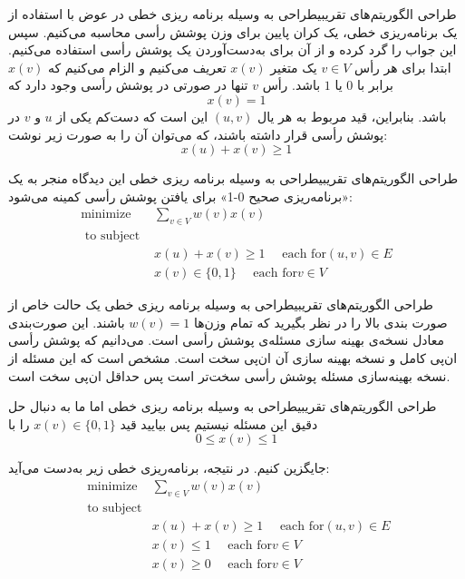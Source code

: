 \begin{itemframe-s}{طراحی الگوریتم‌های تقریبی}{طراحی به وسیله برنامه ریزی خطی}
\itm
در عوض با استفاده از یک برنامه‌ریزی خطی، یک کران پایین برای وزن پوشش رأسی محاسبه می‌کنیم.
سپس این جواب را گرد کرده و از آن برای به‌دست‌آوردن یک پوشش رأسی استفاده می‌کنیم.
\itm
ابتدا برای هر رأس $v \in V$ یک متغیر $x(v)$ تعریف می‌کنیم و الزام می‌کنیم که $x(v)$ برابر با $0$ یا $1$ باشد.
رأس $v$ تنها در صورتی در پوشش رأسی وجود دارد که
$$x(v) = 1$$
باشد. بنابراین، قید مربوط به هر یال $(u, v)$ این است که دست‌کم یکی از $u$ و $v$ در پوشش رأسی قرار داشته باشند، که می‌توان آن را به صورت زیر نوشت:
$$x(u) + x(v) \geq 1$$
\end{itemframe-s}


\begin{itemframe-s}{طراحی الگوریتم‌های تقریبی}{طراحی به وسیله برنامه ریزی خطی}
\itm
این دیدگاه منجر به یک «برنامه‌ریزی صحیح 0-1»
 برای یافتن پوشش رأسی کمینه می‌شود:
\begin{align*}
\text{minimize } & \sum_{v \in V} w(v) x(v)\\
\text{ to subject }& \\[3pt]
&x(u) + x(v) \geq 1 \quad \text{ each for} (u, v) \in E\\[3pt]
&x(v) \in \{0, 1\} \quad \text{ each for} v \in V
\end{align*}
\end{itemframe-s}


\begin{itemframe-s}{طراحی الگوریتم‌های تقریبی}{طراحی به وسیله برنامه ریزی خطی}
\itm
یک حالت خاص از صورت بندی بالا را در نظر بگیرید که تمام وزن‌ها $w(v) = 1$ باشند.  این صورت‌بندی معادل نسخه‌ی بهینه ‌سازی مسئله‌ی پوشش رأسی است. می‌دانیم که پوشش رأسی ان‌پی کامل و نسخه بهینه سازی آن ان‌پی سخت است.
\itm
مشخص است که این مسئله از نسخه بهینه‌سازی مسئله پوشش رأسی سخت‌تر است پس حداقل ان‌پی سخت است.

\end{itemframe-s}


\begin{itemframe-s}{طراحی الگوریتم‌های تقریبی}{طراحی به وسیله برنامه ریزی خطی}
\itm
اما ما به دنبال حل دقیق این مسئله نیستیم پس بیایید قید
$
x(v) \in \{0, 1\}
$
را با
$$
0 \leq x(v) \leq 1
$$

جایگزین کنیم. در نتیجه، برنامه‌ریزی خطی زیر به‌دست می‌آید:
\begin{align*}
\text{ minimize } &\sum_{v \in V} w(v) x(v)\\
\text{ to subject}& \\
&x(u) + x(v) \geq 1 \quad \text{ each for} (u, v) \in E \\
&x(v) \leq 1 \quad \text{ each for} v \in V \\
&x(v) \geq 0 \quad \text{ each for} v \in V\\
\end{align*}

\end{itemframe-s}


